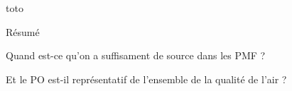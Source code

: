 toto

Résumé

Quand est-ce qu'on a suffisament de source dans les PMF ?

Et le PO est-il représentatif de l'ensemble de la qualité de l'air ?
